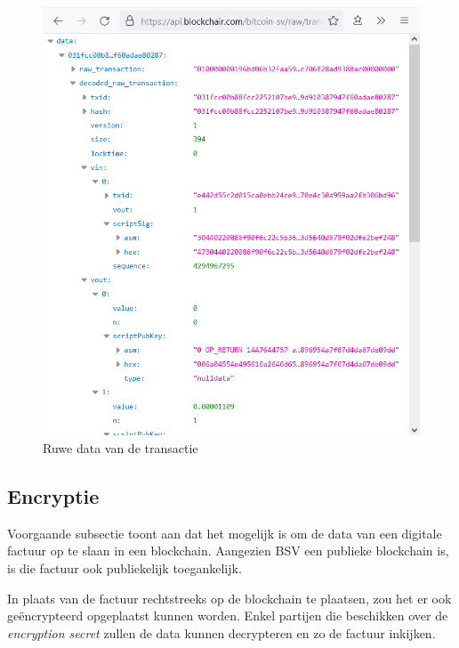 \begin{figure}[H]
	\centering
	\includegraphics[width=0.8\linewidth]{img/proof-of-concept/ruwe-transactie.png}
	\caption{\label{fig:ruwe-transactie}Ruwe data van de transactie}
\end{figure}

\pagebreak

\subsection{Encryptie}
\label{sub:encryptie}

Voorgaande subsectie toont aan dat het mogelijk is om de data van een digitale factuur op te slaan in een blockchain. Aangezien BSV een publieke blockchain is, is die factuur ook publiekelijk toegankelijk.

In plaats van de factuur rechtstreeks op de blockchain te plaatsen, zou het er ook geëncrypteerd opgeplaatst kunnen worden. Enkel partijen die beschikken over de \textit{encryption secret} zullen de data kunnen decrypteren en zo de factuur inkijken. 

